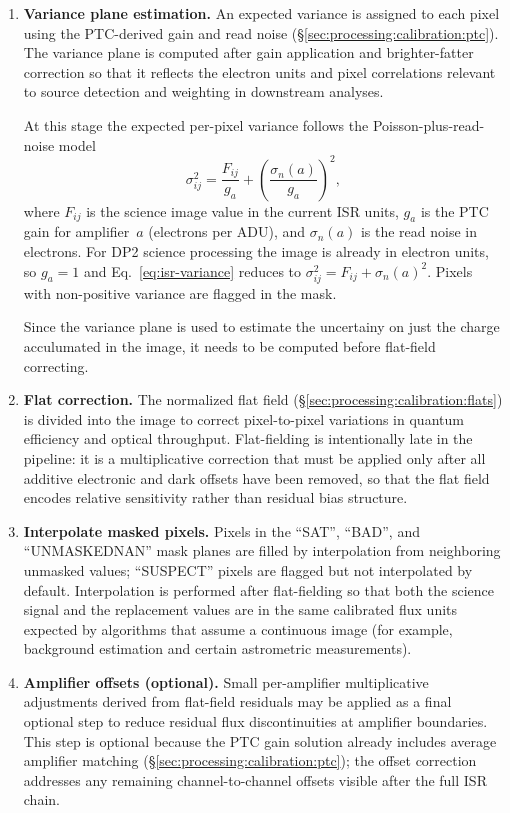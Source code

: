 \begin{enumerate}
    \item \textbf{Variance plane estimation.}
    An expected variance is assigned to each pixel using the PTC-derived gain and read noise (\S\ref{sec:processing:calibration:ptc}).
    The variance plane is computed after gain application and brighter-fatter correction so that it reflects the electron units and pixel correlations relevant to source detection and weighting in downstream analyses.

    At this stage the expected per-pixel variance follows the Poisson-plus-read-noise model
    \begin{equation}
        \sigma^2_{ij} = \frac{F_{ij}}{g_a} + \left(\frac{\sigma_n(a)}{g_a}\right)^2,
        \label{eq:isr-variance}
    \end{equation}
    where $F_{ij}$ is the science image value in the current ISR units, $g_a$ is the PTC gain for amplifier~$a$ (electrons per ADU), and $\sigma_n(a)$ is the read noise in electrons.
    For DP2 science processing the image is already in electron units, so $g_a = 1$ and Eq.~\ref{eq:isr-variance} reduces to $\sigma^2_{ij} = F_{ij} + \sigma_n(a)^2$.
    Pixels with non-positive variance are flagged in the mask.
    
    Since the variance plane is used to estimate the uncertainy on just the charge acculumated in the image, it needs to be computed before flat-field correcting.

    \item \textbf{Flat correction.}
    The normalized flat field (\S\ref{sec:processing:calibration:flats}) is divided into the image to correct pixel-to-pixel variations in quantum efficiency and optical throughput.
    Flat-fielding is intentionally late in the pipeline: it is a multiplicative correction that must be applied only after all additive electronic and dark offsets have been removed, so that the flat field encodes relative sensitivity rather than residual bias structure.

    \item \textbf{Interpolate masked pixels.}
    Pixels in the ``SAT'', ``BAD'', and ``UNMASKEDNAN'' mask planes are filled by interpolation from neighboring unmasked values; ``SUSPECT'' pixels are flagged but not interpolated by default.
    Interpolation is performed after flat-fielding so that both the science signal and the replacement values are in the same calibrated flux units expected by algorithms that assume a continuous image (for example, background estimation and certain astrometric measurements).

    \item \textbf{Amplifier offsets (optional).}
    Small per-amplifier multiplicative adjustments derived from flat-field residuals may be applied as a final optional step to reduce residual flux discontinuities at amplifier boundaries.
    This step is optional because the PTC gain solution already includes average amplifier matching (\S\ref{sec:processing:calibration:ptc}); the offset correction addresses any remaining channel-to-channel offsets visible after the full ISR chain.
\end{enumerate}

